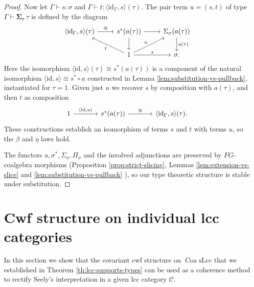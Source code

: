 \documentclass[a4paper]{article}
\theoremstyle{remark}
\theoremstyle{definition}
\begin{document}
\begin{proof}
  Now let $\Gamma \vdash s : \sigma$ and $\Gamma \vdash t : \langle \mathrm{id}_\Gamma, s \rangle(\tau)$.
  The pair term $u = (s, t)$ of type $\Gamma \vdash \mathbf{\Sigma}_\sigma \, \tau$ is defined by the diagram
  \begin{equation}
    \begin{tikzcd}
      \langle \mathrm{id}_\Gamma, s \rangle(\tau) \arrow[r, "\cong"] & s^*(a(\tau)) \arrow[r] \arrow[d] & \Sigma_\sigma(a(\tau)) \arrow[d, "a(\tau)"] \\
      & 1 \arrow[ul, "t"] \arrow[r, "s"] \arrow[ur, "u"] & \sigma.
    \end{tikzcd}
  \end{equation}
  Here the isomorphism $\langle \mathrm{id}, s \rangle(\tau) \cong s^*(a(\tau))$ is a component of the natural isomorphism $\langle \mathrm{id}, s \rangle \cong s^* \circ a$ constructed in Lemma \ref{lem:substitution-vs-pullback}, instantiated for $\tau = 1$.
  Given just $u$ we recover $s$ by composition with $a(\tau)$, and then $t$ as composition
  \begin{equation}
    \begin{tikzcd}[column sep=large]
      1 \arrow[r, "{\langle \mathrm{id}, u \rangle}"] & s^*(a(\tau)) \arrow[r, "\cong"] & \langle \mathrm{id}_\Gamma, s \rangle(\tau).
    \end{tikzcd}
  \end{equation}
  These constructions establish an isomorphism of terms $s$ and $t$ with terms $u$, so the $\beta$ and $\eta$ laws hold.

  The functors $a, \sigma^*, \Sigma_\sigma, \Pi_\sigma$ and the involved adjunctions are preserved by $FG$-coalgebra morphisms (Proposition \ref{prop:strict-slicing}, Lemmas \ref{lem:extension-vs-slice} and \ref{lem:substitution-vs-pullback} ), so our type theoretic structure is stable under substitution.
\end{proof}

\section{Cwf structure on individual lcc categories}
\label{sec:applications}

In this section we show that the covariant cwf structure on $\operatorname{Coa} \mathrm{sLcc}$ that we established in Theorem \ref{th:lcc-supports-types} can be used as a coherence method to rectify Seely's interpretation in a given lcc category $\mathcal{C}$.
\end{document}
